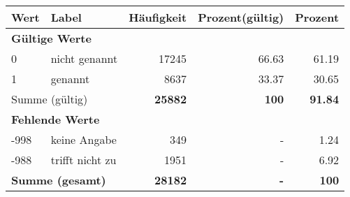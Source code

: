      \begin{longtable}{lXrrr}
     \toprule
     \textbf{Wert} & \textbf{Label} & \textbf{Häufigkeit} & \textbf{Prozent(gültig)} & \textbf{Prozent} \\
     \endhead
     \midrule
     \multicolumn{5}{l}{\textbf{Gültige Werte}}\\

     0 &
     \multicolumn{1}{X}{ nicht genannt   } &


       \num{17245} &
       \num[round-mode=places,round-precision=2]{66.63} &
         \num[round-mode=places,round-precision=2]{61.19} \\

     1 &
     \multicolumn{1}{X}{ genannt   } &


       \num{8637} &
       \num[round-mode=places,round-precision=2]{33.37} &
         \num[round-mode=places,round-precision=2]{30.65} \\
     \midrule
     \multicolumn{2}{l}{Summe (gültig)} &
       \textbf{\num{25882}} &
     \textbf{\num{100}} &
       \textbf{\num[round-mode=places,round-precision=2]{91.84}} \\
     \multicolumn{5}{l}{\textbf{Fehlende Werte}}\\
       -998 &
       keine Angabe &
         \num{349} &
        - &
         \num[round-mode=places,round-precision=2]{1.24} \\
       -988 &
       trifft nicht zu &
         \num{1951} &
        - &
         \num[round-mode=places,round-precision=2]{6.92} \\
     \midrule
     \multicolumn{2}{l}{\textbf{Summe (gesamt)}} &
          \textbf{\num{28182}} &
        \textbf{-} &
        \textbf{\num{100}} \\
     \bottomrule
     \end{longtable}
     
